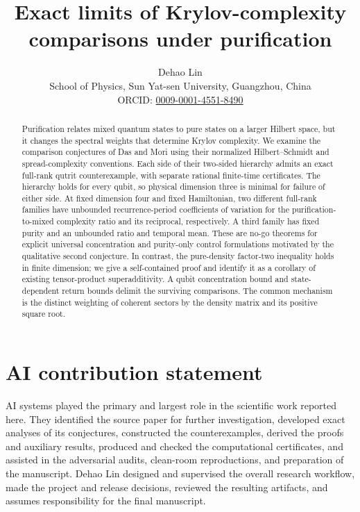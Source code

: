 \documentclass[11pt,a4paper]{article}
\title{Exact limits of Krylov-complexity comparisons under purification}
\author{Dehao Lin\\{\small School of Physics, Sun Yat-sen University, Guangzhou, China}\\
\small ORCID: \href{https://orcid.org/0009-0001-4551-8490}{0009-0001-4551-8490}}
\date{}
\numberwithin{equation}{section}
\theoremstyle{remark}
\begin{document}
\maketitle
\begin{abstract}
Purification relates mixed quantum states to pure states on a larger Hilbert
space, but it changes the spectral weights that determine Krylov complexity.
We examine the comparison conjectures of Das and Mori using their normalized
Hilbert--Schmidt and spread-complexity conventions. Each side of their
two-sided hierarchy admits an exact full-rank qutrit counterexample, with
separate rational finite-time certificates. The hierarchy holds for every
qubit, so physical dimension three is minimal for failure of either side.
At fixed dimension four and fixed Hamiltonian, two different full-rank
families have unbounded recurrence-period coefficients of variation for the
purification-to-mixed complexity ratio and its reciprocal, respectively.
A third family has fixed purity and an unbounded ratio and temporal mean.
These are no-go theorems for explicit universal concentration and purity-only
control formulations motivated by the qualitative second conjecture.
In contrast, the pure-density factor-two inequality holds in finite dimension;
we give a self-contained proof and identify it as a corollary of existing
tensor-product superadditivity. A qubit concentration bound and
state-dependent return bounds delimit the surviving comparisons. The common
mechanism is the distinct weighting of coherent sectors by the density matrix
and its positive square root.
\end{abstract}







\appendix



\section*{AI contribution statement}
AI systems played the primary and largest role in the scientific work reported here. They identified the source paper for further investigation, developed exact analyses of its conjectures, constructed the counterexamples, derived the proofs and auxiliary results, produced and checked the computational certificates, and assisted in the adversarial audits, clean-room reproductions, and preparation of the manuscript. Dehao Lin designed and supervised the overall research workflow, made the project and release decisions, reviewed the resulting artifacts, and assumes responsibility for the final manuscript.
\end{document}
